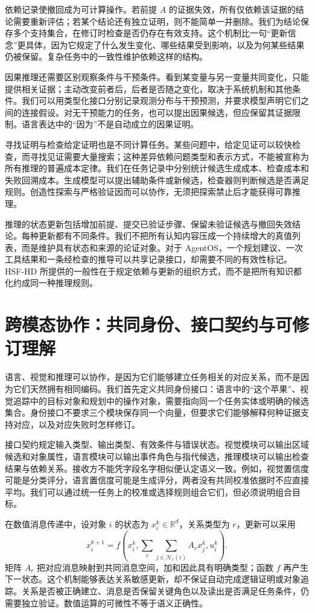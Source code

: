 依赖记录使撤回成为可计算操作。若前提 $A$ 的证据失效，所有仅依赖该证据的结论需要重新评估；若某个结论还有独立证明，则不能简单一并删除。我们为结论保存多个支持集合，在修订时检查是否仍存在有效支持。这个机制比一句“更新信念”更具体，因为它规定了什么发生变化、哪些结果受到影响，以及为何某些结果仍被保留。复杂任务中的一致性维护依赖这样的结构。

因果推理还需要区别观察条件与干预条件。看到某变量与另一变量共同变化，只能提供相关证据；主动改变前者后，后者是否随之变化，取决于系统机制和其他条件。我们可以用类型化接口分别记录观测分布与干预预测，并要求模型声明它们之间的连接假设。对无干预能力的任务，也可以提出因果候选，但应保留其证据限制。语言表达中的“因为”不是自动成立的因果证明。

寻找证明与检查给定证明也是不同计算任务。某些问题中，给定见证可以较快检查，而寻找见证需要大量搜索；这种差异依赖问题类型和表示方式，不能被宣称为所有推理的普遍成本定律。我们在任务记录中分别统计候选生成成本、检查成本和失败回溯成本。生成模型可以提出辅助条件或新候选，检查器则判断候选是否满足规则。创造性探索与严格验证因而可以协作，无须把探索禁止后才能获得可靠推理。

推理的状态更新包括增加前提、提交已验证步骤、保留未验证候选与撤回失效结论。每种更新都有不同条件。我们不把所有认知内容压成一个持续增大的真值列表，而是维护具有状态和来源的论证对象。对于 AgentOS，一个规划建议、一次工具结果和一条经检查的推导可以共享记录接口，却需要不同的有效性标记。HSF-HD 所提供的一般性在于规定依赖与更新的组织方式，而不是把所有知识都化约成同一种推理规则。

\section{跨模态协作：共同身份、接口契约与可修订理解}

语言、视觉和推理可以协作，是因为它们能够建立任务相关的对应关系，而不是因为它们天然拥有相同编码。我们首先定义共同身份接口：语言中的“这个苹果”、视觉追踪中的目标对象和规划中的操作对象，需要指向同一个任务实体或明确的候选集合。身份接口不要求三个模块保存同一个向量，但要求它们能够解释何种证据支持对应，以及对应失败时怎样修订。

接口契约规定输入类型、输出类型、有效条件与错误状态。视觉模块可以输出区域候选和对象属性，语言模块可以输出事件角色与指代候选，推理模块可以输出检查结果与依赖关系。接收方不能凭字段名字相似便认定语义一致。例如，视觉置信度可能是分类评分，语言置信度可能是生成评分，两者没有共同校准依据时不应直接平均。我们可以通过统一任务上的校准或选择规则组合它们，但必须说明组合目标。

在数值消息传递中，设对象 $i$ 的状态为 $x_i^k\in\mathbb R^d$，关系类型为 $r$，更新可以采用
\begin{equation}
x_i^{k+1}=f\left(x_i^k,\sum_r\sum_{j\in\mathcal N_r(i)}A_r x_j^k,u_i^k\right).
\end{equation}
矩阵 $A_r$ 把对应消息映射到共同消息空间，加和因此具有明确类型；函数 $f$ 再产生下一状态。这个机制能够表达关系敏感更新，却不保证自动完成逻辑证明或对象追踪。关系是否被正确建立、消息是否保留关键角色以及读出是否满足任务条件，仍需要独立验证。数值运算的可微性不等于语义正确性。

